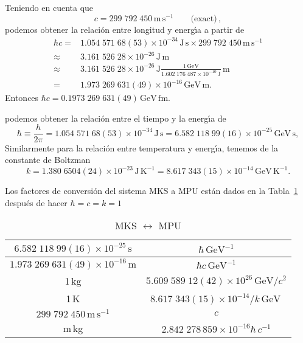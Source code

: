 Teniendo en cuenta que \cite{PDG}
\begin{equation}
    c=299\;792\;450\,\text{m}\,\text{s}^{-1}\qquad\text{(exact)}\,,
\end{equation}
podemos obtener la relaci\'on entre longitud y energ\'\i a a partir de
\begin{align}
  \hbar c=&1.054\;571\;68(53)\times10^{-34}\,\text{J}\,\text{s}\times299\;792\;450\,\text{m}\,\text{s}^{-1} \nonumber\\
  \approx&3.161\;526\;28\times10^{-26}\,\text{J}\,\text{m}\nonumber\\
  \approx&3.161\;526\;28\times10^{-26}\,{\text{J}}\frac{1\,\text{GeV}}{1.602\;176\;487\times10^{-10}\,\text{J}}\,\text{m}\nonumber\\
  =&1.973\;269\;631(49)\times10^{-16}\,\text{GeV}\,\text{m}.
\end{align}
Entonces $\hbar c =0.1973\;269\;631(49)\,\text{GeV}\,\text{fm}$.

podemos obtener la relaci\'on entre el tiempo y la energ\'\i a de
\begin{equation}
  \hbar\equiv\frac{h}{2\pi}=1.054\;571\;68(53)\times10^{-34}\,\text{J}\,\text{s}
  =6.582\;118\;99(16)\times10^{-25}\,\text{GeV}\,\text{s},
\end{equation}
Similarmente para la relaci\'on entre temperatura y energ\'\i a, tenemos de la constante de Boltzman
\begin{equation}
  k=1.380\;6504(24)\times10^{-23}\,\text{J}\,\text{K}^{-1}=8.617\;343(15)\times10^{-14}\,\text{GeV}\,\text{K}^{-1}.
\end{equation}


Los factores de conversi\'on del sistema MKS a MPU est\'an dados en la Tabla~\ref{tab:mks2mpu} despu\'es de hacer $\hbar=c=k=1$

\begin{table} %
  \centering %
  \begin{tabular}{c|c} %
$6.582\;118\;99(16)\times10^{-25}\,\text{s}$ & $ {\hbar}\,\text{GeV}^{-1}$\\\hline
$1.973\;269\;631(49)\times10^{-16}\,\text{m}$ & $ {\hbar c}\,\text{GeV}^{-1} $\\ \hline
1\,kg& $5.609\;589\;12(42)\times10^{26}\,\text{GeV}/c^2$ \\ \hline
1\,K & $8.617\;343(15)\times10^{-14}/k\,\text{GeV}$\,\\ \hline
$299\;792\;450\,\text{m}\,\text{s}^{-1}$&$c$\\ \hline
m\,kg&$2.842\;278\,859\times10^{-16}\hbar\,c^{-1}$\\ \hline
  \end{tabular} %
  \caption{MKS $\leftrightarrow$ MPU} %
  \label{tab:mks2mpu} %
\end{table} %

